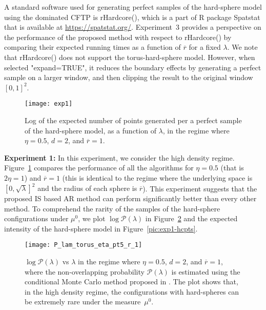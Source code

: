 \documentclass[11pt]{article}
\newcommand{\rbdd}{\overline{r}}
\newcommand{\pno}{\mathcal{P}(\lambda)}
\begin{document}
A standard software used for generating perfect samples of the hard-sphere model using the dominated CFTP is {\sf rHardcore()}, which is a part of {\sf R} package {\sf Spatstat} that is available at \href{https://spatstat.org/}{https://spatstat.org/}. Experiment~3 provides a perspective on the performance of the proposed method with respect to {\sf rHardcore()} by comparing their expected running times as a function of $\rbdd$ for a fixed $\lambda$. We note that {\sf rHardcore()} does not support the torus-hard-sphere model. However, when selected "expand=TRUE",  it reduces the boundary effects by generating a perfect sample on a larger window, and then clipping the result to the original window $[0,1]^2$.\\

\begin{figure}[H]
 \centering
\texttt{[image: exp1]}
\caption{Log of the expected number of points generated per a perfect sample of the hard-sphere model, as a function of $\lambda$, in the regime where $\eta = 0.5$, $d = 2$, and $\rbdd = 1$.}
\label{pic:Compare1}
\end{figure}

\noindent
{\bf Experiment 1:} In this experiment, we consider the high density regime.  Figure~\ref{pic:Compare1} compares the performance of all the algorithms for $\eta = 0.5$ (that is $2\eta = 1$) and  $\rbdd = 1$ ({this is identical to the regime where the underlying space is $[0, \sqrt{\lambda}]^2$ and the radius of each sphere is $\rbdd$}). 
This experiment suggests that the proposed IS based AR method can perform significantly better than every other method. To comprehend the rarity of the samples of the hard-sphere configurations under $\mu^0$, we plot $\log \pno$ in Figure~\ref{pic:exp1-plam} and the expected intensity of the hard-sphere model in Figure~\ref{pic:exp1-hcpts}.\\

\begin{figure}[H]
 \centering
\texttt{[image: P\_lam\_torus\_eta\_pt5\_r\_1]}
\caption{$\log \pno$ vs $\lambda$ in the regime where $\eta = 0.5$, $d = 2$, and $\rbdd = 1$, where the non-overlapping probability $\pno$ is estimated using the conditional Monte Carlo method proposed in \cite{HMTK20}. The plot shows that, in the high density regime, the configurations with hard-spheres can be extremely rare under the measure~$\mu^0$.}
\label{pic:exp1-plam}
\end{figure}
\end{document}
